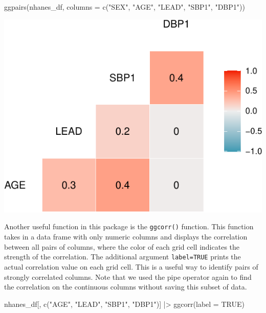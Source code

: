 \documentclass[
  letterpaper,
]{latex/krantz}
\makeatletter
\newenvironment{Shaded}{\begin{snugshade}}{\end{snugshade}}
\newcommand{\AttributeTok}[1]{\textcolor[rgb]{0.40,0.45,0.13}{#1}}
\newcommand{\ConstantTok}[1]{\textcolor[rgb]{0.56,0.35,0.01}{#1}}
\newcommand{\FunctionTok}[1]{\textcolor[rgb]{0.28,0.35,0.67}{#1}}
\newcommand{\NormalTok}[1]{\textcolor[rgb]{0.00,0.23,0.31}{#1}}
\newcommand{\SpecialCharTok}[1]{\textcolor[rgb]{0.37,0.37,0.37}{#1}}
\newcommand{\StringTok}[1]{\textcolor[rgb]{0.13,0.47,0.30}{#1}}
\newenvironment{kframe}{%
\medskip{}
\setlength{\fboxsep}{.8em}
 \def\at@end@of@kframe{}%
 \ifinner\ifhmode%
  \def\at@end@of@kframe{\end{minipage}}%
  \begin{minipage}{\columnwidth}%
 \fi\fi%
 \def\FrameCommand##1{\hskip\@totalleftmargin \hskip-\fboxsep
 \colorbox{shadecolor}{##1}\hskip-\fboxsep
     \hskip-\linewidth \hskip-\@totalleftmargin \hskip\columnwidth}%
 \MakeFramed {\advance\hsize-\width
   \@totalleftmargin\z@ \linewidth\hsize
   \@setminipage}}%
 {\par\unskip\endMakeFramed%
 \at@end@of@kframe}
\renewenvironment{Shaded}{\begin{kframe}}{\end{kframe}}
\makeatother
\begin{document}
\begin{Shaded}
\begin{Highlighting}[]
\FunctionTok{ggpairs}\NormalTok{(nhanes\_df, }\AttributeTok{columns =} \FunctionTok{c}\NormalTok{(}\StringTok{"SEX"}\NormalTok{, }\StringTok{"AGE"}\NormalTok{, }\StringTok{"LEAD"}\NormalTok{, }\StringTok{"SBP1"}\NormalTok{, }\StringTok{"DBP1"}\NormalTok{))}
\end{Highlighting}
\end{Shaded}

\begin{center}
\includegraphics[width=1\textwidth,height=\textheight]{book/exploratory_analysis_files/figure-pdf/unnamed-chunk-24-1.pdf}
\end{center}

Another useful function in this package is the
\texttt{ggcorr()}
function. This function takes in a data frame with only numeric columns
and displays the correlation between all pairs of columns, where the
color of each grid cell indicates the strength of the correlation. The
additional argument \texttt{label=TRUE} prints the actual correlation
value on each grid cell. This is a useful way to identify pairs of
strongly correlated columns. Note that we used the pipe operator again
to find the correlation on the continuous columns without saving this
subset of data.

\begin{Shaded}
\begin{Highlighting}[]
\NormalTok{nhanes\_df[, }\FunctionTok{c}\NormalTok{(}\StringTok{"AGE"}\NormalTok{, }\StringTok{"LEAD"}\NormalTok{, }\StringTok{"SBP1"}\NormalTok{, }\StringTok{"DBP1"}\NormalTok{)] }\SpecialCharTok{|\textgreater{}}
  \FunctionTok{ggcorr}\NormalTok{(}\AttributeTok{label =} \ConstantTok{TRUE}\NormalTok{)}
\end{Highlighting}
\end{Shaded}
\end{document}
